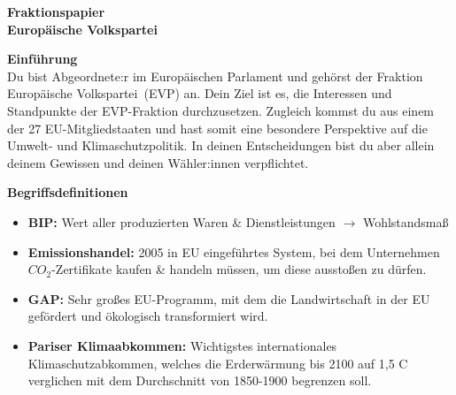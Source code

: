\documentclass[11pt]{article}
\newcommand{\Fraktionsname}{Europäische Volkspartei}
\newcommand{\Fraktionskuerzel}{EVP}
\newcommand{\Fraktionsname}{Progressive Allianz der Sozialdemokraten}
\newcommand{\Fraktionskuerzel}{S\&D}
\newcommand{\Fraktionsname}{Renew Europe}
\newcommand{\Fraktionskuerzel}{Renew}
\newcommand{\Fraktionsname}{Die Grünen/Europäische Freie Allianz}
\newcommand{\Fraktionskuerzel}{Grüne/EFA}
\newcommand{\Fraktionsname}{Identität \& Demokratie}
\newcommand{\Fraktionskuerzel}{ID}
\newcommand{\policy}{Umwelt- und Klimaschutzpolitik}
\newcommand{\glossar}{
        		\item \textbf{Emissionshandel:} 2005 in EU eingeführtes System, bei dem Unternehmen $CO_2$-Zertifikate kaufen \& handeln müssen, um diese ausstoßen zu dürfen.
        		\item \textbf{GAP:} Sehr großes EU-Programm, mit dem  die Landwirtschaft in der EU gefördert und ökologisch transformiert wird.
        		\item \textbf{Pariser Klimaabkommen:} Wichtigstes internationales Klimaschutzabkommen, welches die Erderwärmung bis 2100 auf 1,5 \degree C verglichen mit dem Durchschnitt von 1850-1900 begrenzen soll.
        }
\newcommand{\policy}{Asyl- \& Migrationspolitik}
\newcommand{\glossar}{
        		\item \textbf{Dublin-Verordnung:} Legt fest, dass der EU-Mitgliedstaat für Asylverfahren zuständig ist, der zuerst von Asylsuchendem betreten wurde.
        		\item \textbf{Solidaritätsmechnismus:} Jeder EU-Mitgliedstaat muss einen bestimmten Anteil der Asylsuchenden aufnehmen.
        		\item \textbf{Transitzentren:} Asylsuchende sollen an EU-Außengrenzen festgehalten werden, damit ihr Antrag ohne Einreise bearbeitet werden kann.
        }
\newcommand{\policy}{Außen- und Sicherheitspolitik}
\newcommand{\glossar}{
            \item \textbf{Europäische Verteidigungs-\newline agentur:} Unterstützt EU-\newline Mitgliedstaaten bei der Entwicklung ihrer militärischen Ressourcen 
            \item \textbf{Hoher Vertreter für Außen- und Sicherheitspolitik:} Vizepräsident der EU-Kommission, der als "EU-Außenminister" agiert
            \item \textbf{Rüstungskontrolle:} Internationale Vereinbarungen zur Verringerung/zum Verbot bestimmter Waffen
            \item \textbf{Verteidigungsfonds:} Geldreserve der EU, aus der Rüstungsprojekte der Mitgliedstaaten gefördert werden
     	}
\begin{document}
\vspace*{1cm}

\noindent \textbf{\huge Fraktionspapier}\\
\newline
\textbf{\huge \Fraktionsname}
\newline

\vspace{1cm}
\noindent
\begin{minipage}[t]{0.45\textwidth}
    \textbf{\Large Einführung}\\
    \newline
    Du bist Abgeordnete:r im Europäischen Parlament und gehörst der Fraktion \Fraktionsname\ (\Fraktionskuerzel) an. Dein Ziel ist es, die Interessen und Standpunkte der \Fraktionskuerzel -Fraktion durchzusetzen. Zugleich kommst du aus einem der 27 EU-Mitgliedstaaten und hast somit eine besondere Perspektive auf die \policy. In deinen Entscheidungen bist du aber allein deinem Gewissen und deinen Wähler:innen verpflichtet. \newline
    
    \vspace*{0.4cm}
    
    \textbf{\Large Begriffsdefinitionen}\\
    \raggedright
    \vspace{-0.5cm}
    \begin{itemize}
        \item \textbf{BIP:} Wert aller produzierten Waren \& Dienstleistungen $\to$ Wohlstandsmaß
        \glossar
    \end{itemize}
\end{minipage}%
\hfill
\end{document}
